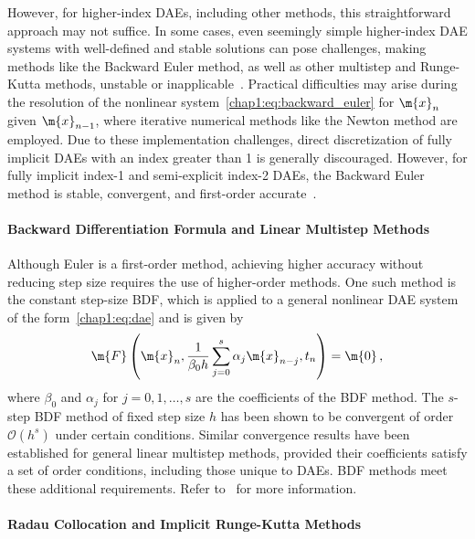 However, for higher-index \acp{DAE}, including other methods, this straightforward approach may not suffice. In some cases, even seemingly simple higher-index \ac{DAE} systems with well-defined and stable solutions can pose challenges, making methods like the Backward Euler method, as well as other multistep and Runge-Kutta methods, unstable or inapplicable~\cite{ascher1998computer}. Practical difficulties may arise during the resolution of the nonlinear system~\eqref{chap1:eq:backward_euler} for $\m{x}_n$ given $\m{x}_{n-1}$, where iterative numerical methods like the Newton method are employed. Due to these implementation challenges, direct discretization of fully implicit \acp{DAE} with an index greater than 1 is generally discouraged. However, for fully implicit index-1 and semi-explicit index-2 \acp{DAE}, the Backward Euler method is stable, convergent, and first-order accurate~\cite{brenan1995numerical, hairer1999stiff}.

\paragraph{Backward Differentiation Formula and Linear Multistep Methods}

Although Euler is a first-order method, achieving higher accuracy without reducing step size requires the use of higher-order methods. One such method is the constant step-size \ac{BDF}, which is applied to a general nonlinear \ac{DAE} system of the form~\eqref{chap1:eq:dae} and is given by
%
\begin{equation*}
  \m{F}\left(\m{x}_n, \dfrac{1}{\beta_0 h} \sum_{j=0}^{s} \alpha_j \m{x}_{n-j}, t_n\right) = \m{0} \, \text{,}
\end{equation*}
%
where $\beta_0$ and $\alpha_j$ for $j = 0, 1, \dots, s$ are the coefficients of the \ac{BDF} method. The $s$-step \ac{BDF} method of fixed step size $h$ has been shown to be convergent of order $\mathcal{O}(h^s)$ under certain conditions. Similar convergence results have been established for general linear multistep methods, provided their coefficients satisfy a set of order conditions, including those unique to \acp{DAE}. \ac{BDF} methods meet these additional requirements. Refer to~\cite{brenan1995numerical} for more information.

\paragraph{Radau Collocation and Implicit Runge-Kutta Methods}

